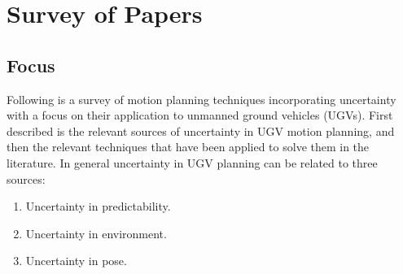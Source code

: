 \chapter{Survey of Papers}




\section{Focus}
Following is a survey of motion planning techniques incorporating uncertainty
with a focus on their application to unmanned ground vehicles (UGVs). First
described is the relevant sources of uncertainty in UGV motion planning, and
then the relevant techniques that have been applied to solve them in the
literature. In general uncertainty in UGV planning can be related to three
sources:
\begin{enumerate}
\item Uncertainty in predictability.
\item Uncertainty in environment.
\item Uncertainty in pose.
\end{enumerate}~\cite{lavalleFrameworkMotionPlanning1995}

